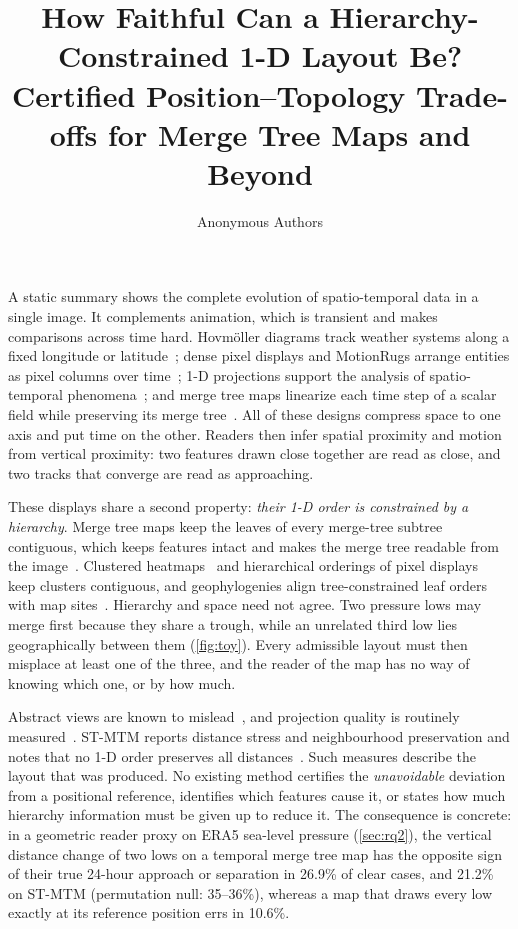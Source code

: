 \documentclass[review]{vgtc}                 %
\title{How Faithful Can a Hierarchy-Constrained 1-D Layout Be?\\Certified Position--Topology Trade-offs for Merge Tree Maps and Beyond}
\author{Anonymous Authors}   %
\begin{document}
\maketitle

A static summary shows the complete evolution of spatio-temporal data in a single image. It complements animation, which is transient and makes comparisons across time hard. Hovm\"oller diagrams track weather systems along a fixed longitude or latitude~\cite{Hovmoller:1949}; dense pixel displays and MotionRugs arrange entities as pixel columns over time~\cite{Keim:2000:PIX,Buchmueller:2019:MR}; 1-D projections support the analysis of spatio-temporal phenomena~\cite{Franke:2021:1DP}; and merge tree maps linearize each time step of a scalar field while preserving its merge tree~\cite{Koepp:2023:TMTM,STMTM:2026}. All of these designs compress space to one axis and put time on the other. Readers then infer spatial proximity and motion from vertical proximity: two features drawn close together are read as close, and two tracks that converge are read as approaching.

These displays share a second property: \emph{their 1-D order is constrained by a hierarchy}. Merge tree maps keep the leaves of every merge-tree subtree contiguous, which keeps features intact and makes the merge tree readable from the image~\cite{Koepp:2023:TMTM}. Clustered heatmaps~\cite{Eisen:1998:CA} and hierarchical orderings of pixel displays~\cite{Franke:2021:1DP} keep clusters contiguous, and geophylogenies align tree-constrained leaf orders with map sites~\cite{Klawitter:2025:GP}. Hierarchy and space need not agree. Two pressure lows may merge first because they share a trough, while an unrelated third low lies geographically between them (\cref{fig:toy}). Every admissible layout must then misplace at least one of the three, and the reader of the map has no way of knowing which one, or by how much.

Abstract views are known to mislead~\cite{McNutt:2020:SVM,Wattenberg:2016:TSNE}, and projection quality is routinely measured~\cite{Venna:2001:NP,Aupetit:2007:VD}. ST-MTM reports distance stress and neighbourhood preservation and notes that no 1-D order preserves all distances~\cite{STMTM:2026}. Such measures describe the layout that was produced. No existing method certifies the \emph{unavoidable} deviation from a positional reference, identifies which features cause it, or states how much hierarchy information must be given up to reduce it. The consequence is concrete: in a geometric reader proxy on ERA5 sea-level pressure (\cref{sec:rq2}), the vertical distance change of two lows on a temporal merge tree map has the opposite sign of their true 24-hour approach or separation in 26.9\% of clear cases, and 21.2\% on ST-MTM (permutation null: 35--36\%), whereas a map that draws every low exactly at its reference position errs in 10.6\%.
\end{document}
